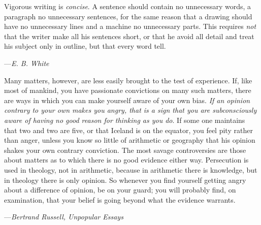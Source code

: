 \documentclass[20pt,a4paper]{article}
\begin{document}
\setmainfont[Language=English]{Gentium Book Basic}
\renewcommand{\epigraphsize}{\small}
\setlength{\epigraphwidth}{1.0\textwidth}

\epigraph
{
    Vigorous writing is \emph{concise}. A sentence should contain no unnecessary words, a paragraph no unnecessary sentences, for the same reason that a drawing should have no unnecessary lines and a machine no unnecessary parts. This requires \emph{not} that the writer make all his sentences short, or that he avoid all detail and treat his subject only in outline, but that every word tell.
}
{
    ---\textit{E. B. White}
}
\epigraph
{
    Many matters, however, are less easily brought to the test of experience. If, like most of mankind, you have passionate convictions on many such matters, there are ways in which you can make yourself aware of your own bias. \emph{If an opinion contrary to your own makes you angry, that is a sign that you are subconsciously aware of having no good reason for thinking as you do}. If some one maintains that two and two are five, or that Iceland is on the equator, you feel pity rather than anger, unless you know so little of arithmetic or geography that his opinion shakes your own contrary conviction. The most savage controversies are those about matters as to which there is no good evidence either way. Persecution is used in theology, not in arithmetic, because in arithmetic there is knowledge, but in theology there is only opinion. So whenever you find yourself getting angry about a difference of opinion, be on your guard; you will probably find, on examination, that your belief is going beyond what the evidence warrants.
}
{
    ---\textit{Bertrand Russell, Unpopular Essays}
}
\end{document}
